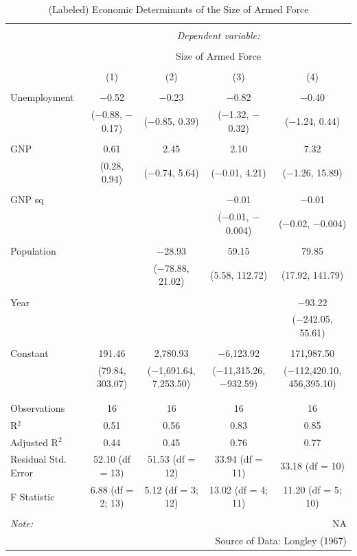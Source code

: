 \documentclass[11pt,]{article}
\begin{document}
\begin{table}[!htbp] \centering 
  \caption{(Labeled) Economic Determinants of the Size of Armed Force} 
  \label{tab:arm3} 
\footnotesize 
\begin{tabular}{@{\extracolsep{5pt}}lcccc} 
\\[-1.8ex]\hline 
\hline \\[-1.8ex] 
 & \multicolumn{4}{c}{\textit{Dependent variable:}} \\ 
\cline{2-5} 
\\[-1.8ex] & \multicolumn{4}{c}{Size of Armed Force} \\ 
\\[-1.8ex] & (1) & (2) & (3) & (4)\\ 
\hline \\[-1.8ex] 
 Unemployment & $-$0.52 & $-$0.23 & $-$0.82 & $-$0.40 \\ 
  & ($-$0.88, $-$0.17) & ($-$0.85, 0.39) & ($-$1.32, $-$0.32) & ($-$1.24, 0.44) \\ 
  & & & & \\ 
 GNP & 0.61 & 2.45 & 2.10 & 7.32 \\ 
  & (0.28, 0.94) & ($-$0.74, 5.64) & ($-$0.01, 4.21) & ($-$1.26, 15.89) \\ 
  & & & & \\ 
 GNP sq &  &  & $-$0.01 & $-$0.01 \\ 
  &  &  & ($-$0.01, $-$0.004) & ($-$0.02, $-$0.004) \\ 
  & & & & \\ 
 Population &  & $-$28.93 & 59.15 & 79.85 \\ 
  &  & ($-$78.88, 21.02) & (5.58, 112.72) & (17.92, 141.79) \\ 
  & & & & \\ 
 Year &  &  &  & $-$93.22 \\ 
  &  &  &  & ($-$242.05, 55.61) \\ 
  & & & & \\ 
 Constant & 191.46 & 2,780.93 & $-$6,123.92 & 171,987.50 \\ 
  & (79.84, 303.07) & ($-$1,691.64, 7,253.50) & ($-$11,315.26, $-$932.59) & ($-$112,420.10, 456,395.10) \\ 
  & & & & \\ 
\hline \\[-1.8ex] 
Observations & 16 & 16 & 16 & 16 \\ 
R$^{2}$ & 0.51 & 0.56 & 0.83 & 0.85 \\ 
Adjusted R$^{2}$ & 0.44 & 0.45 & 0.76 & 0.77 \\ 
Residual Std. Error & 52.10 (df = 13) & 51.53 (df = 12) & 33.94 (df = 11) & 33.18 (df = 10) \\ 
F Statistic & 6.88 (df = 2; 13) & 5.12 (df = 3; 12) & 13.02 (df = 4; 11) & 11.20 (df = 5; 10) \\ 
\hline 
\hline \\[-1.8ex] 
\textit{Note:}  & \multicolumn{4}{r}{NA} \\ 
 & \multicolumn{4}{r}{Source of Data: Longley (1967)} \\ 
\end{tabular} 
\end{table}
\end{document}
